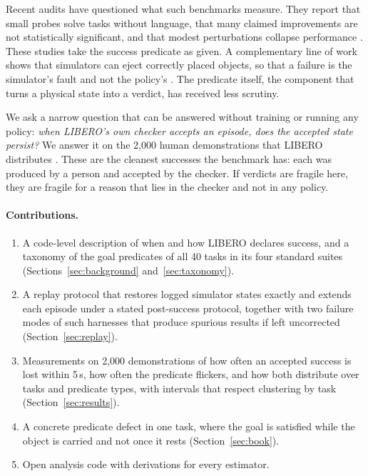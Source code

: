 \documentclass[10pt,twocolumn]{article}
\begin{document}
Recent audits have questioned what such benchmarks measure. They report that small probes solve tasks without language, that many claimed improvements are not statistically significant, and that modest perturbations collapse performance \cite{jiang2026benchmarking,zhou2025liberopro,fei2025liberoplus}. These studies take the success predicate as given. A complementary line of work shows that simulators can eject correctly placed objects, so that a failure is the simulator's fault and not the policy's \cite{zhou2026simuguard}. The predicate itself, the component that turns a physical state into a verdict, has received less scrutiny.

We ask a narrow question that can be answered without training or running any policy: \emph{when LIBERO's own checker accepts an episode, does the accepted state persist?} We answer it on the 2{,}000 human demonstrations that LIBERO distributes \cite{liu2023libero}. These are the cleanest successes the benchmark has: each was produced by a person and accepted by the checker. If verdicts are fragile here, they are fragile for a reason that lies in the checker and not in any policy.

\paragraph{Contributions.}
\begin{enumerate}
\item A code-level description of when and how LIBERO declares success, and a taxonomy of the goal predicates of all 40 tasks in its four standard suites (Sections~\ref{sec:background} and~\ref{sec:taxonomy}).
\item A replay protocol that restores logged simulator states exactly and extends each episode under a stated post-success protocol, together with two failure modes of such harnesses that produce spurious results if left uncorrected (Section~\ref{sec:replay}).
\item Measurements on 2{,}000 demonstrations of how often an accepted success is lost within 5\,s, how often the predicate flickers, and how both distribute over tasks and predicate types, with intervals that respect clustering by task (Section~\ref{sec:results}).
\item A concrete predicate defect in one task, where the goal is satisfied while the object is carried and not once it rests (Section~\ref{sec:book}).
\item Open analysis code with derivations for every estimator.
\end{enumerate}
\end{document}
